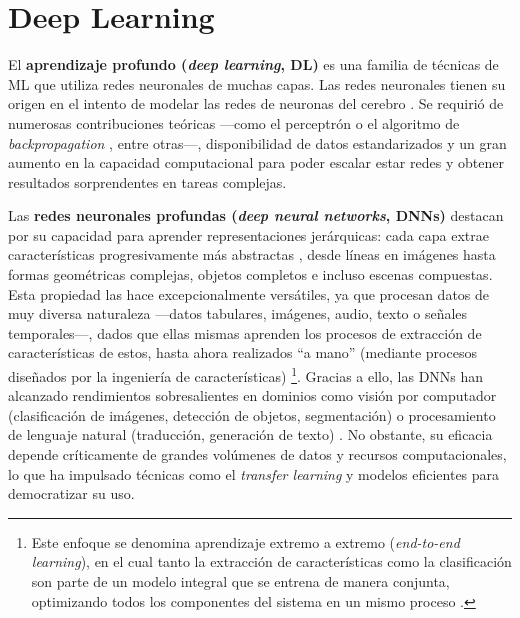 
\section{Deep Learning}

El \textbf{aprendizaje profundo (\textit{deep learning}, DL)} es una familia de técnicas de ML que utiliza
redes neuronales de muchas capas. 
Las redes neuronales tienen su origen en el intento de modelar las redes de neuronas del cerebro 
\cite{mcculloch1943}. Se requirió de numerosas contribuciones teóricas ---como el perceptrón 
\cite{rosenblatt1958} o el algoritmo de \textit{backpropagation} \cite{rumelhart1986,werbos1994}, entre 
otras---, disponibilidad de datos estandarizados y un gran aumento en la capacidad computacional para poder 
escalar estar redes y obtener resultados 
sorprendentes en tareas complejas.

Las \textbf{redes neuronales profundas (\textit{deep neural networks}, DNNs)} destacan por su capacidad para 
aprender representaciones jerárquicas: cada capa extrae características progresivamente más abstractas 
\cite{lecun2015}, desde líneas en imágenes hasta formas geométricas complejas, objetos completos e incluso 
escenas compuestas.
Esta propiedad las hace excepcionalmente versátiles, ya que procesan datos de muy diversa naturaleza ---datos 
tabulares, imágenes, audio, texto o señales temporales---, dados que ellas mismas aprenden los procesos de 
extracción de características de estos, hasta ahora realizados ``a mano'' (mediante procesos diseñados por la 
ingeniería de características) \cite{rusell2021} \footnote{Este enfoque se denomina aprendizaje extremo a 
extremo (\textit{end-to-end learning}), en el cual tanto la extracción de características como la 
clasificación son parte de un modelo integral que se entrena de manera conjunta, optimizando todos los 
componentes del sistema en un mismo proceso \cite{rusell2021}.}. Gracias a ello, las DNNs han alcanzado 
rendimientos sobresalientes en dominios como visión por computador (clasificación de imágenes, detección de 
objetos, segmentación) o procesamiento de lenguaje natural (traducción, generación de texto) 
\cite{redhat2024DeepLearningDefinition}.
No obstante, su eficacia depende críticamente de grandes volúmenes de datos y recursos computacionales, lo que 
ha impulsado técnicas como el \textit{transfer learning} y modelos eficientes para democratizar su uso.


